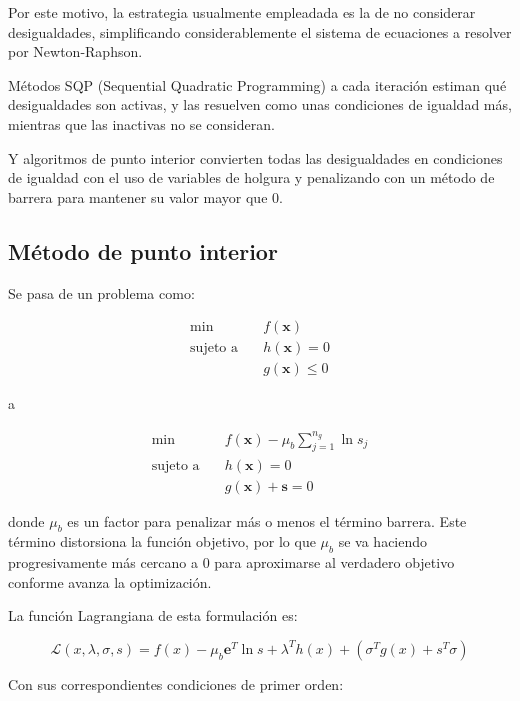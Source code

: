 Por este motivo, la estrategia usualmente empleadada es la de no considerar
desigualdades, simplificando considerablemente el sistema de ecuaciones a
resolver por Newton-Raphson.

Métodos SQP (Sequential Quadratic Programming) a cada iteración estiman qué
desigualdades son activas, y las resuelven como unas condiciones de igualdad
más, mientras que las inactivas no se consideran.

Y algoritmos de punto interior convierten todas las desigualdades en
condiciones de igualdad con el uso de variables de holgura y penalizando con un
método de barrera para mantener su valor mayor que 0.


\subsection{Método de punto interior}

Se pasa de un problema como:

\begin{align}
	\min \quad            & f(\mathbf{x})         \\
	\text{sujeto a} \quad & h(\mathbf{x}) = 0     \\
	                      & g(\mathbf{x}) \leq  0
\end{align}

a

\begin{align}
	\min \quad            & f(\mathbf{x}) - \mu_b \sum_{j=1}^{n_g} \ln s_j \\
	\text{sujeto a} \quad & h(\mathbf{x}) = 0                              \\
	                      & g(\mathbf{x}) + \mathbf{s} = 0
\end{align}

donde $\mu_b$ es un factor para penalizar más o menos el término barrera. Este
término distorsiona la función objetivo, por lo que $\mu_b$ se va haciendo
progresivamente más cercano a 0 para aproximarse al verdadero objetivo conforme
avanza la optimización.

La función Lagrangiana de esta formulación es:

\begin{equation}
	\mathcal{L}(x, \lambda, \sigma, s) = f(x) - \mu_b \mathbf{e}^T \ln s + \lambda^T h(x) + (\sigma^T g(x) + s^T \sigma)
\end{equation}

Con sus correspondientes condiciones de primer orden:

